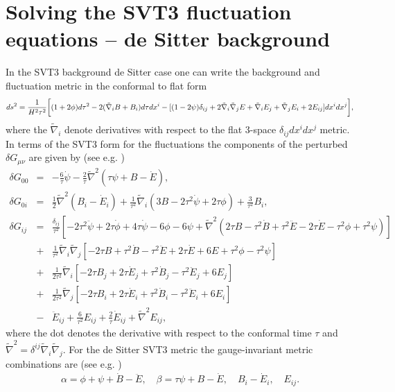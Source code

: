\documentclass[aps,onecolumn,10pt]{revtex4}
\numberwithin{equation}{section}
\numberwithin{equation}{section}
\begin{document}
\section{Solving the SVT3 fluctuation equations -- de Sitter background}
\label{S7}
In the SVT3 background de Sitter case one can write the background and fluctuation metric in the conformal to flat form
%
\begin{eqnarray}
ds^2 =\frac{1}{H^2\tau^2}\bigg{[}(1+2\phi) d\tau^2 -2(\tilde{\nabla}_i B +B_i)d\tau dx^i - [(1-2\psi)\delta_{ij} +2\tilde{\nabla}_i\tilde{\nabla}_j E + \tilde{\nabla}_i E_j + \tilde{\nabla}_j E_i + 2E_{ij}]dx^i dx^j\bigg{]},
\label{7.1}
\end{eqnarray}
%
where the $\tilde{\nabla}_{i}$ denote derivatives with respect to the flat 3-space $\delta_{ij}dx^idx^j$ metric.
In terms of the SVT3 form for the fluctuations the components of the perturbed $\delta G_{\mu\nu}$ are given by (see e.g. \cite{Amarasinghe2018})
%
\begin{eqnarray}
\delta G_{00}&=&-\frac{6}{\tau}\dot{\psi}-\frac{2}{\tau}\tilde{\nabla}^2(\tau \psi +B-\dot{E}),
\nonumber\\
\delta G_{0i}&=&\frac{1}{2}\tilde{\nabla}^2(B_i-\dot{E}_i)+\frac{1}{\tau^2}\tilde{\nabla}_i(3B-2\tau^2\dot{\psi}+2\tau \phi)+\frac{3}{\tau^2}B_i,
\nonumber\\
\delta G_{ij}&=&\frac{\delta_{ij}}{\tau^2}\left[-2\tau^2\ddot{\psi}+2\tau\dot{\phi}+4\tau\dot{\psi}-6\phi-6\psi+\tilde{\nabla}^2\left(2\tau B-\tau^2\dot{B}+\tau^2\ddot{E}-2\tau\dot{E}-\tau^2\phi+\tau^2\psi\right)\right]
\nonumber\\
&+&\frac{1}{\tau^2}\tilde{\nabla}_i\tilde{\nabla}_j\left[-2\tau B +\tau^2\dot{B}-\tau^2\ddot{E}+2\tau\dot{E}+6E+\tau^2\phi-\tau^2\psi\right]
\nonumber\\
&+&\frac{1}{2\tau^2}\tilde{\nabla}_i\left[-2\tau B_j+2\tau\dot{E}_j+\tau^2\dot{B}_j-\tau^2\ddot{E}_j+6E_j\right]
\nonumber\\
&+&\frac{1}{2\tau^2}\tilde{\nabla}_j\left[-2\tau B_i+2\tau\dot{E}_i+\tau^2\dot{B}_i-\tau^2\ddot{E}_i+6E_i\right]
\nonumber\\
&-&\ddot{E}_{ij}+\frac{6}{\tau^2}E_{ij}+\frac{2}{\tau}\dot{E}_{ij}+\tilde{\nabla}^2E_{ij},
\label{7.2}
\end{eqnarray}
%
where the dot denotes the derivative with respect to the conformal time $\tau$ and $\tilde{\nabla}^2=\delta^{ij}\tilde{\nabla}_i\tilde{\nabla}_j$. 
For the de Sitter SVT3 metric the gauge-invariant metric combinations are (see e.g. \cite{Amarasinghe2018})
%
\begin{eqnarray}
\alpha=\phi+\psi+\dot{B}-\ddot{E} ,\quad \beta=\tau\psi+B-\dot{E}, \quad B_i-\dot{E}_i,\quad E_{ij}.
\label{7.3}
\end{eqnarray}
\end{document}
